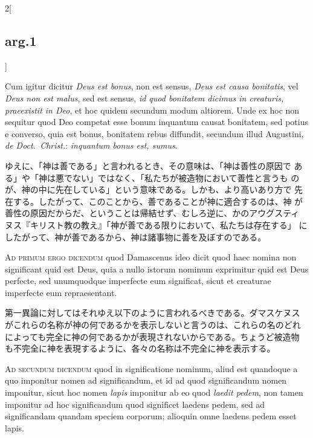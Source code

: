 \documentclass[paper=a4paper,fontsize=10pt,jafontsize=9pt,titlepage]{jlreq}
\begin{document}
\begin{paracol}{2}[\subsection{arg.1}]
\switchcolumn*

Cum igitur dicitur {\itshape Deus est bonus}, non est sensus, {\itshape Deus est
causa bonitatis}, vel {\itshape Deus non est malus}, sed est sensus, {\itshape
id quod bonitatem dicimus in creaturis, praeexistit in Deo}, et hoc
quidem secundum modum altiorem. Unde ex hoc non sequitur quod Deo
competat esse bonum inquantum causat bonitatem, sed potius e converso,
quia est bonus, bonitatem rebus diffundit, secundum illud Augustini,
{\itshape de Doct.\ Christ.}: {\itshape inquantum bonus est, sumus}.

\switchcolumn

ゆえに、「神は善である」と言われるとき、その意味は、「神は善性の原因で
ある」や「神は悪でない」ではなく、「私たちが被造物において善性と言うも
のが、神の中に先在している」という意味である。しかも、より高いあり方で
先在する。したがって、このことから、善であることが神に適合するのは、神
が善性の原因だからだ、ということは帰結せず、むしろ逆に、かのアウグスティ
ヌス『キリスト教の教え』「神が善である限りにおいて、私たちは存在する」
にしたがって、神が善であるから、神は諸事物に善を及ぼすのである。

\switchcolumn*[\subsection{ad.1}]

{\scshape Ad primum ergo dicendum} quod Damascenus ideo dicit quod haec
nomina non significant quid est Deus, quia a nullo istorum nominum
exprimitur quid est Deus perfecte, sed unumquodque imperfecte eum
significat, sicut et creaturae imperfecte eum repraesentant.

\switchcolumn

第一異論に対してはそれゆえ以下のように言われるべきである。ダマスケヌス
がこれらの名称が神の何であるかを表示しないと言うのは、これらの名のどれ
によっても完全に神の何であるかが表現されないからである。ちょうど被造物
も不完全に神を表現するように、各々の名称は不完全に神を表示する。

\switchcolumn*[\subsection{ad.2}]

{\scshape Ad secundum dicendum} quod in significatione nominum, aliud est
quandoque a quo imponitur nomen ad significandum, et id ad quod
significandum nomen imponitur, sicut hoc nomen {\itshape lapis} imponitur
ab eo quod {\itshape laedit pedem}, non tamen imponitur ad hoc
significandum quod significet laedens pedem, sed ad significandam
quandam speciem corporum; alioquin omne laedens pedem esset lapis.


\end{paracol}
\end{document}
